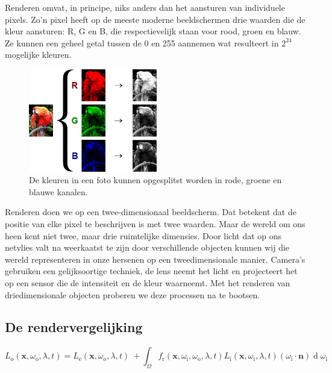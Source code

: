 \documentclass[12pt, a4paper]{article}
\begin{document}
Renderen omvat, in principe, niks anders dan het aansturen van individuele pixels. Zo'n pixel heeft op de meeste moderne beeldschermen drie waarden die de kleur aansturen: R, G en B, die respectievelijk staan voor rood, groen en blauw. Ze kunnen een geheel getal tussen de 0 en 255 aannemen wat resulteert in \(2^{24}\) mogelijke kleuren.
\begin{figure}[h]
\centering
\includegraphics[width=0.5\textwidth]{RGB_channels_separation.png}
\caption{De kleuren in een foto kunnen opgesplitst worden in rode, groene en blauwe kanalen.}
\label{fig:rgb_separated}
\end{figure}

Renderen doen we op een twee-dimensionaal beeldscherm. Dat betekent dat de positie van elke pixel te beschrijven is met twee waarden. Maar de wereld om ons heen kent niet twee, maar drie ruimtelijke dimensies. Door licht dat op ons netvlies valt na weerkaatst te zijn door verschillende objecten kunnen wij die wereld representeren in onze hersenen op een tweedimensionale manier. Camera's gebruiken een gelijksoortige techniek, de lens neemt het licht en projecteert het op een sensor die de intensiteit en de kleur waarneemt. Met het renderen van driedimensionale objecten proberen we deze processen na te bootsen. 

\subsection{De rendervergelijking}
\[
L_{\text{o}}(\mathbf x, \omega_{\text{o}}, \lambda, t) = L_{\text{e}}(\mathbf x, \omega_{\text{o}}, \lambda, t) \ + \int_\Omega f_{\text{r}}(\mathbf x, \omega_{\text{i}}, \omega_{\text{o}}, \lambda, t) L_{\text{i}}(\mathbf x, \omega_{\text{i}}, \lambda, t) (\omega_{\text{i}}\cdot\mathbf n) \operatorname d \omega_{\text{i}}
\]
\end{document}
